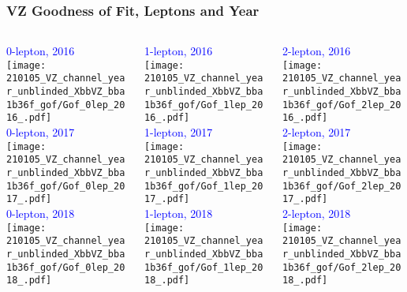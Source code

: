 \documentclass{beamer}
\begin{document}
\begin{frame}
  \frametitle{VZ Goodness of Fit, Leptons and Year}

  \begin{columns}
    \begin{column}{0.3\linewidth}
      \centering
      \textcolor{blue}{0-lepton, 2016} \\
      \texttt{[image: 210105\_VZ\_channel\_year\_unblinded\_XbbVZ\_bba1b36f\_gof/Gof\_0lep\_2016\_.pdf]} \\
      \textcolor{blue}{0-lepton, 2017} \\
      \texttt{[image: 210105\_VZ\_channel\_year\_unblinded\_XbbVZ\_bba1b36f\_gof/Gof\_0lep\_2017\_.pdf]} \\
      \textcolor{blue}{0-lepton, 2018} \\
      \texttt{[image: 210105\_VZ\_channel\_year\_unblinded\_XbbVZ\_bba1b36f\_gof/Gof\_0lep\_2018\_.pdf]}
    \end{column}
    \begin{column}{0.3\linewidth}
      \centering
      \textcolor{blue}{1-lepton, 2016} \\
      \texttt{[image: 210105\_VZ\_channel\_year\_unblinded\_XbbVZ\_bba1b36f\_gof/Gof\_1lep\_2016\_.pdf]} \\
      \textcolor{blue}{1-lepton, 2017} \\
      \texttt{[image: 210105\_VZ\_channel\_year\_unblinded\_XbbVZ\_bba1b36f\_gof/Gof\_1lep\_2017\_.pdf]} \\
      \textcolor{blue}{1-lepton, 2018} \\
      \texttt{[image: 210105\_VZ\_channel\_year\_unblinded\_XbbVZ\_bba1b36f\_gof/Gof\_1lep\_2018\_.pdf]}
    \end{column}
    \begin{column}{0.3\linewidth}
      \centering
      \textcolor{blue}{2-lepton, 2016} \\
      \texttt{[image: 210105\_VZ\_channel\_year\_unblinded\_XbbVZ\_bba1b36f\_gof/Gof\_2lep\_2016\_.pdf]} \\
      \textcolor{blue}{2-lepton, 2017} \\
      \texttt{[image: 210105\_VZ\_channel\_year\_unblinded\_XbbVZ\_bba1b36f\_gof/Gof\_2lep\_2017\_.pdf]} \\
      \textcolor{blue}{2-lepton, 2018} \\
      \texttt{[image: 210105\_VZ\_channel\_year\_unblinded\_XbbVZ\_bba1b36f\_gof/Gof\_2lep\_2018\_.pdf]}
    \end{column}
  \end{columns}

\end{frame}
\end{document}
